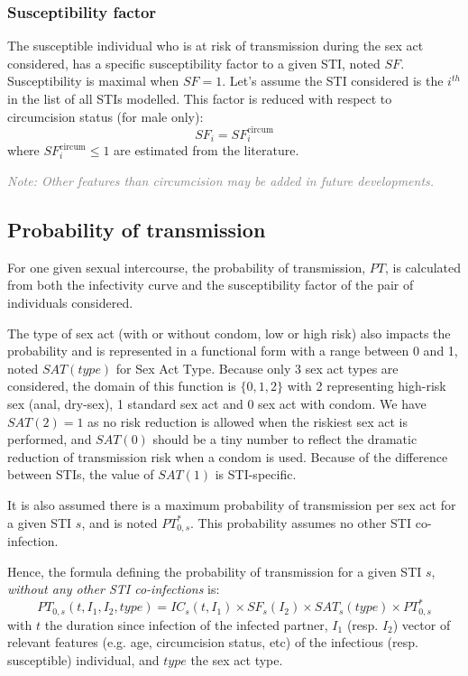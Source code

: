 \documentclass[11pt, onecolumn]{article}
\newcommand{\note}[1]{\textit{\textcolor{Grey}{Note: #1}}}
\begin{document}
\subsubsection*{Susceptibility factor}
The susceptible individual who is at risk of transmission during the sex act considered, has a specific susceptibility factor to a given STI, noted $SF$. Susceptibility is maximal when $SF=1$. Let's assume the STI considered is the $i^{th}$ in the list of all STIs modelled. This factor is reduced with respect to circumcision status (for male only):
$$SF_i =SF_i^{\mathrm{circum}} $$
where $SF_i^{\mathrm{circum}}\leq 1$ are estimated from the literature.

\note{Other features than circumcision may be added in future developments.}

\subsection{Probability of transmission}

For one given sexual intercourse, the probability of transmission, $PT$, is calculated from both the infectivity curve and the susceptibility factor of the pair of individuals considered. 

The type of sex act (with or without condom, low or high risk) also impacts the probability and is represented in a functional form with a range between 0 and 1, noted $SAT(type)$ for Sex Act Type. Because only 3 sex act types are considered, the domain of this function is $\{0,1,2\}$ with 2 representing high-risk sex (anal, dry-sex), 1 standard sex act and 0 sex act with condom. We have $SAT(2)=1$ as no risk reduction is allowed when the riskiest sex act is performed, and $SAT(0)$ should be a tiny number to reflect the dramatic reduction of transmission risk when a condom is used. Because of the difference between STIs, the value of $SAT(1)$ is STI-specific.

It is also assumed there is a maximum probability of transmission per sex act for a given STI $s$, and is noted $PT_{0,s}^*$. This probability assumes no other STI co-infection. 

Hence, the formula defining the probability of transmission for a given STI $s$, \emph{without any other STI co-infections} is:
$$PT_{0,s}(t,I_1,I_2,type) =  IC_s(t,I_1)\times SF_s(I_2) \times SAT_s(type) \times PT_{0,s}^* $$
with $t$ the duration since infection of the infected partner, $I_1$ (resp. $I_2$) vector of relevant features (e.g. age, circumcision status, etc) of the infectious (resp. susceptible) individual, and $type$ the sex act type.
\end{document}
